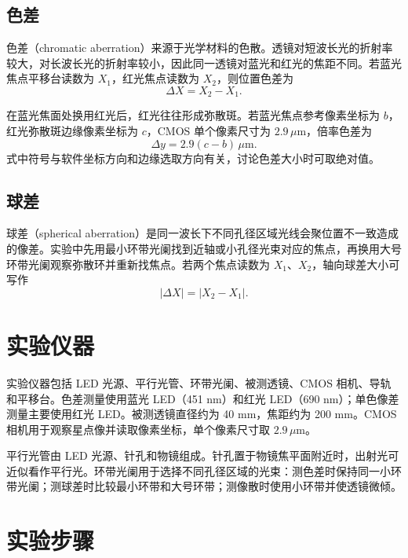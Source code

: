\documentclass[12pt,a4paper]{article}
\begin{document}
\subsection{色差}

色差（chromatic aberration）来源于光学材料的色散。透镜对短波长光的折射率较大，对长波长光的折射率较小，因此同一透镜对蓝光和红光的焦距不同。若蓝光焦点平移台读数为 $X_1$，红光焦点读数为 $X_2$，则位置色差为
\begin{equation}
  \Delta X = X_2-X_1 .
\end{equation}

在蓝光焦面处换用红光后，红光往往形成弥散斑。若蓝光焦点参考像素坐标为 $b$，红光弥散斑边缘像素坐标为 $c$，CMOS 单个像素尺寸为 $2.9\,\mu\mathrm{m}$，倍率色差为
\begin{equation}
  \Delta y=2.9(c-b)\,\mu\mathrm{m}.
\end{equation}
式中符号与软件坐标方向和边缘选取方向有关，讨论色差大小时可取绝对值。

\subsection{球差}

球差（spherical aberration）是同一波长下不同孔径区域光线会聚位置不一致造成的像差。实验中先用最小环带光阑找到近轴或小孔径光束对应的焦点，再换用大号环带光阑观察弥散环并重新找焦点。若两个焦点读数为 $X_1$、$X_2$，轴向球差大小可写作
\begin{equation}
  |\Delta X|=|X_2-X_1|.
\end{equation}

\section{实验仪器}

实验仪器包括 LED 光源、平行光管、环带光阑、被测透镜、CMOS 相机、导轨和平移台。色差测量使用蓝光 LED（451 nm）和红光 LED（690 nm）；单色像差测量主要使用红光 LED。被测透镜直径约为 40 mm，焦距约为 200 mm。CMOS 相机用于观察星点像并读取像素坐标，单个像素尺寸取 $2.9\,\mu\mathrm{m}$。

平行光管由 LED 光源、针孔和物镜组成。针孔置于物镜焦平面附近时，出射光可近似看作平行光。环带光阑用于选择不同孔径区域的光束：测色差时保持同一小环带光阑；测球差时比较最小环带和大号环带；测像散时使用小环带并使透镜微倾。

\section{实验步骤}
\end{document}
